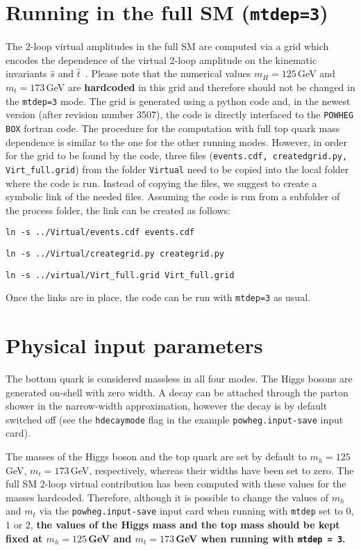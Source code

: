 \documentclass[paper]{JHEP3}
\newcommand\POWHEGBOX{{\tt POWHEG BOX}}
\begin{document}
\section{Running in the full SM ({\tt mtdep=3})}
The 2-loop virtual amplitudes in the full SM are computed via a grid
which encodes the dependence of the virtual 2-loop amplitude on the
kinematic invariants $\hat{s}$ and
$\hat{t}$~\cite{Heinrich:2017kxx}. Please note that the numerical
values $m_H=125$\,GeV and $m_t=173$\,GeV are {\bf hardcoded} in this
grid and therefore should not be changed in the {\tt mtdep=3} mode.
The grid is generated using a python code and, in the newest version
(after revision number 3507), the code is directly interfaced to the
\POWHEGBOX{} fortran code. The procedure for the computation with full
top quark mass dependence is similar to the one for the other running
modes. However, in order for the grid to be found by the code, three
files ({\tt events.cdf, createdgrid.py, Virt\_full.grid}) from the
folder {\tt Virtual} need to be copied into the local folder where the
code is run. Instead of copying the files, we suggest to create a
symbolic link of the needed files. Assuming the code is run from a
subfolder of the process folder, the link can be created as follows:
\begin{description}
\item{\tt ln -s ../Virtual/events.cdf events.cdf}
\item{\tt ln -s ../Virtual/creategrid.py creategrid.py}
\item{\tt ln -s ../virtual/Virt\_full.grid Virt\_full.grid}
\end{description}
Once the links are in place, the code can be run with {\tt mtdep=3} as
usual.

\section{Physical input parameters}

The bottom quark is considered massless in all four modes. The Higgs
bosons are generated on-shell with zero width. A decay can be attached
through the parton shower in the narrow-width approximation, however
the decay is by default switched off (see the {\tt hdecaymode} flag in the
example {\tt powheg.input-save} input card).

The masses of the Higgs boson and the top quark are set by default to
$m_h=125$\,GeV, $m_t=173$\,GeV, respectively, whereas their widths
have been set to zero. The full SM 2-loop virtual contribution has
been computed with these values for the masses hardcoded. 
Therefore, although it is possible to change the values of $m_h$
and $m_t$ via the {\tt powheg.input-save} input card when running with
{\tt mtdep} set to $0$, $1$ or $2$, {\bf the values of the Higgs mass and
the top mass should be kept fixed at $m_h=125$\,GeV and $m_t=173$\,GeV
when running with {\tt mtdep = 3}.}
\end{document}
